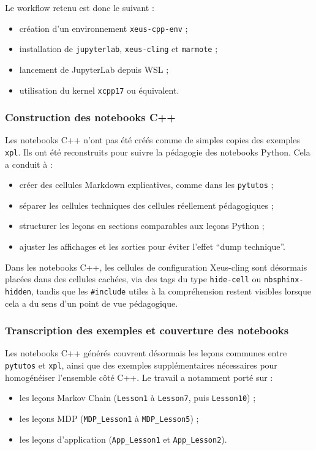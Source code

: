 \documentclass[a4paper,12pt,twoside]{article}
\begin{document}
Le workflow retenu est donc le suivant :
\begin{itemize}
    \item création d'un environnement \texttt{xeus-cpp-env} ;
    \item installation de \texttt{jupyterlab}, \texttt{xeus-cling} et \texttt{marmote} ;
    \item lancement de JupyterLab depuis WSL ;
    \item utilisation du kernel \texttt{xcpp17} ou équivalent.
\end{itemize}

\subsubsection{Construction des notebooks C++}

Les notebooks C++ n'ont pas été créés comme de simples copies des exemples \texttt{xpl}. Ils ont été reconstruits pour suivre la pédagogie des notebooks Python. Cela a conduit à :
\begin{itemize}
    \item créer des cellules Markdown explicatives, comme dans les \texttt{pytutos} ;
    \item séparer les cellules techniques des cellules réellement pédagogiques ;
    \item structurer les leçons en sections comparables aux leçons Python ;
    \item ajuster les affichages et les sorties pour éviter l'effet ``dump technique''.
\end{itemize}

Dans les notebooks C++, les cellules de configuration Xeus-cling sont désormais placées dans des cellules cachées, via des tags du type \texttt{hide-cell} ou \texttt{nbsphinx-hidden}, tandis que les \texttt{\#include} utiles à la compréhension restent visibles lorsque cela a du sens d'un point de vue pédagogique.

\subsubsection{Transcription des exemples et couverture des notebooks}

Les notebooks C++ générés couvrent désormais les leçons communes entre \texttt{pytutos} et \texttt{xpl}, ainsi que des exemples supplémentaires nécessaires pour homogénéiser l'ensemble côté C++. Le travail a notamment porté sur :
\begin{itemize}
    \item les leçons Markov Chain (\texttt{Lesson1} à \texttt{Lesson7}, puis \texttt{Lesson10}) ;
    \item les leçons MDP (\texttt{MDP\_Lesson1} à \texttt{MDP\_Lesson5}) ;
    \item les leçons d'application (\texttt{App\_Lesson1} et \texttt{App\_Lesson2}).
\end{itemize}
\end{document}
